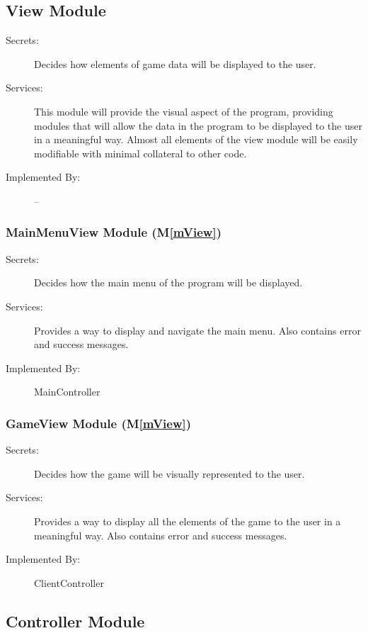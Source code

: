 \documentclass[12pt, titlepage]{article}
\newcommand{\mref}[1]{M\ref{#1}}
\begin{document}
\subsection{View Module}
    \begin{description}
    \item[Secrets:] Decides how elements of game data will be displayed to the user.
    \item[Services:] This module will provide the visual aspect of the program, providing modules that will allow the data in the program to be displayed to the user in a meaningful way. Almost all elements of the view module will be easily modifiable with minimal collateral to other code.
    \item[Implemented By:] --
    \end{description}

\subsubsection{ MainMenuView Module (\mref{mView})}
    \begin{description}
    \item[Secrets:] Decides how the main menu of the program will be displayed.
    \item[Services:] Provides a way to display and navigate the main menu. Also contains error and success messages.
    \item[Implemented By:] MainController
    \end{description}
    
\subsubsection{ GameView Module (\mref{mView})}
    \begin{description}
    \item[Secrets:] Decides how the game will be visually represented to the user.
    \item[Services:] Provides a way to display all the elements of the game to the user in a meaningful way. Also contains error and success messages.
    \item[Implemented By:] ClientController
    \end{description}


\subsection{Controller Module}
\end{document}
